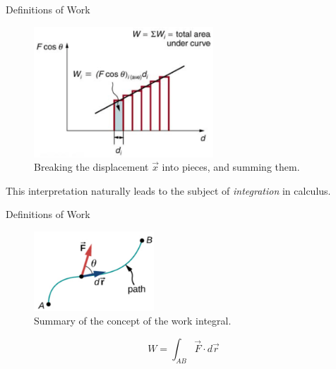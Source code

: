 \documentclass{beamer}
\begin{document}
\begin{frame}{Definitions of Work}
\begin{figure}
\centering
\includegraphics[width=0.6\textwidth]{figures/integral.png}
\caption{\label{fig:work3} Breaking the displacement $\vec{x}$ into pieces, and summing them.}
\end{figure}
\small
This interpretation naturally leads to the subject of \textit{integration} in calculus.  
\end{frame}

\begin{frame}{Definitions of Work}
\begin{figure}
\centering
\includegraphics[width=0.4\textwidth]{figures/line.png}
\caption{\label{fig:line} Summary of the concept of the work integral.}
\end{figure}
\begin{equation}
W = \int_{AB} \vec{F} \cdot d\vec{r}
\end{equation}
\end{frame}
\end{document}
